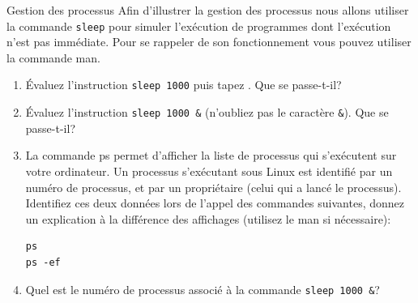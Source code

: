 \begin{exercice}
  \begin{exercicelet}{Gestion des processus}
    Afin d'illustrer la gestion des processus nous allons utiliser la
    commande \texttt{sleep} pour simuler l'exécution de programmes dont
    l'exécution n'est pas immédiate. Pour se rappeler de son
    fonctionnement vous pouvez utiliser la commande man.
    \begin{enumerate}\setcounter{enumi}{\value{cnti}}
    \item Évaluez l'instruction \verb|sleep 1000| puis tapez
      \Ctrl{}. Que se passe-t-il?
    \item Évaluez l'instruction \verb|sleep 1000 &| (n'oubliez pas le
      caractère \verb|&|). Que se passe-t-il?
    \item La commande ps permet d'afficher la liste de processus qui
      s'exécutent sur votre ordinateur. Un processus s'exécutant sous
      Linux est identifié par un numéro de processus, et par un
      propriétaire (celui qui a lancé le processus). Identifiez ces deux
      données lors de l'appel des commandes suivantes, donnez un
      explication à la différence des affichages (utilisez le man si
      nécessaire):
\begin{verbatim}
ps
ps -ef
\end{verbatim}
    \item Quel est le numéro de processus associé à la commande
      \verb|sleep 1000 &|?
      \setcounter{cnti}{\value{enumi}}
    \end{enumerate}
  \end{exercicelet}
\end{exercice}
